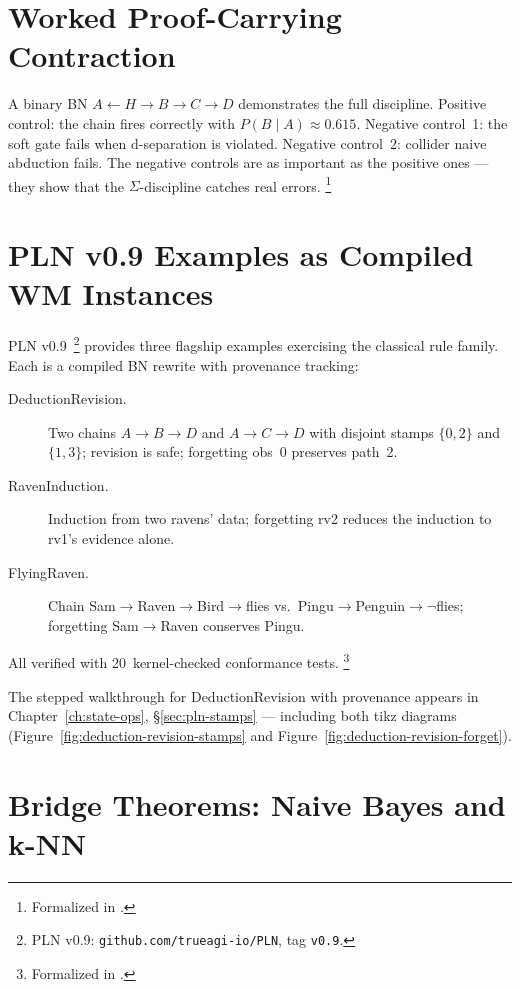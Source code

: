 \documentclass[11pt,openany]{report}
\begin{document}
\section{Worked Proof-Carrying Contraction}

A binary BN $A \leftarrow H \to B \to C \to D$ demonstrates the full
discipline.  Positive control: the chain fires correctly with
$P(B \mid A) \approx 0.615$.  Negative control~1: the soft gate
fails when d-separation is violated.  Negative control~2: collider
naive abduction fails.  The negative controls are as important as
the positive ones --- they show that the $\Sigma$-discipline catches
real errors.%
\footnote{Formalized in
.}


\section{PLN v0.9 Examples as Compiled WM Instances}

PLN v0.9~\cite{goertzel2009pln}\footnote{PLN v0.9:
\texttt{github.com/trueagi-io/PLN}, tag \texttt{v0.9}.} provides
three flagship examples exercising the classical rule family.  Each
is a compiled BN rewrite with provenance tracking:

\begin{description}
\item[DeductionRevision.]  Two chains $A \to B \to D$ and
  $A \to C \to D$ with disjoint stamps $\{0,2\}$ and $\{1,3\}$;
  revision is safe; forgetting obs~0 preserves path~2.

\item[RavenInduction.]  Induction from two ravens' data; forgetting
  rv2 reduces the induction to rv1's evidence alone.

\item[FlyingRaven.]  Chain Sam$\to$Raven$\to$Bird$\to$flies vs.\
  Pingu$\to$Penguin$\to\neg$flies; forgetting Sam$\to$Raven
  conserves Pingu.
\end{description}

\noindent
All verified with 20~kernel-checked conformance tests.%
\footnote{Formalized in
.}

The stepped walkthrough for DeductionRevision with provenance
appears in Chapter~\ref{ch:state-ops},
\S\ref{sec:pln-stamps} --- including both tikz diagrams
(Figure~\ref{fig:deduction-revision-stamps} and
Figure~\ref{fig:deduction-revision-forget}).


\section{Bridge Theorems: Naive Bayes and k-NN}
\label{sec:bridge-nb-knn}
\end{document}
